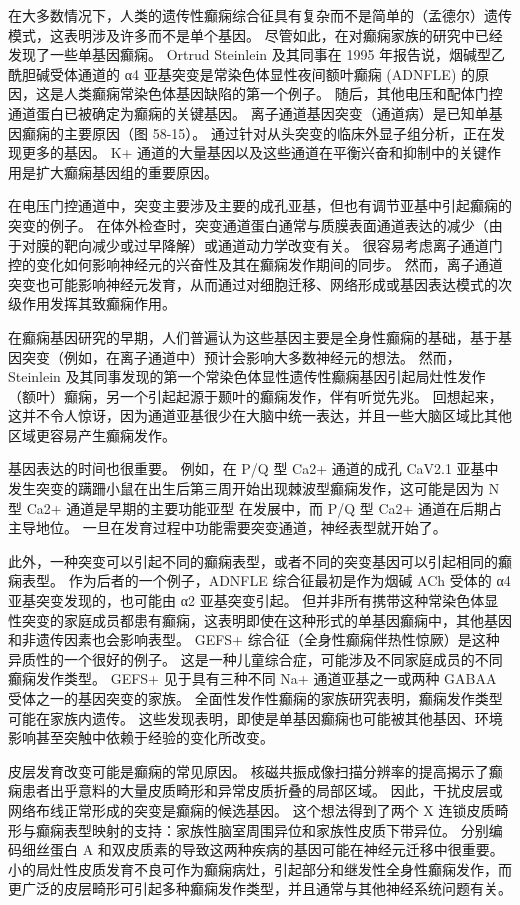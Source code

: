 在大多数情况下，人类的遗传性癫痫综合征具有复杂而不是简单的（孟德尔）遗传模式，这表明涉及许多而不是单个基因。
尽管如此，在对癫痫家族的研究中已经发现了一些单基因癫痫。
Ortrud Steinlein 及其同事在 1995 年报告说，烟碱型乙酰胆碱受体通道的 α4 亚基突变是常染色体显性夜间额叶癫痫 (ADNFLE) 的原因，这是人类癫痫常染色体基因缺陷的第一个例子。
随后，其他电压和配体门控通道蛋白已被确定为癫痫的关键基因。
离子通道基因突变（通道病）是已知单基因癫痫的主要原因（图 58-15）。
通过针对从头突变的临床外显子组分析，正在发现更多的基因。
K+ 通道的大量基因以及这些通道在平衡兴奋和抑制中的关键作用是扩大癫痫基因组的重要原因。


在电压门控通道中，突变主要涉及主要的成孔亚基，但也有调节亚基中引起癫痫的突变的例子。
在体外检查时，突变通道蛋白通常与质膜表面通道表达的减少（由于对膜的靶向减少或过早降解）或通道动力学改变有关。
很容易考虑离子通道门控的变化如何影响神经元的兴奋性及其在癫痫发作期间的同步。
然而，离子通道突变也可能影响神经元发育，从而通过对细胞迁移、网络形成或基因表达模式的次级作用发挥其致癫痫作用。


在癫痫基因研究的早期，人们普遍认为这些基因主要是全身性癫痫的基础，基于基因突变（例如，在离子通道中）预计会影响大多数神经元的想法。
然而，Steinlein 及其同事发现的第一个常染色体显性遗传性癫痫基因引起局灶性发作（额叶）癫痫，另一个引起起源于颞叶的癫痫发作，伴有听觉先兆。
回想起来，这并不令人惊讶，因为通道亚基很少在大脑中统一表达，并且一些大脑区域比其他区域更容易产生癫痫发作。


基因表达的时间也很重要。
例如，在 P/Q 型 Ca2+ 通道的成孔 CaV2.1 亚基中发生突变的蹒跚小鼠在出生后第三周开始出现棘波型癫痫发作，这可能是因为 N 型 Ca2+ 通道是早期的主要功能亚型 在发展中，而 P/Q 型 Ca2+ 通道在后期占主导地位。
一旦在发育过程中功能需要突变通道，神经表型就开始了。


此外，一种突变可以引起不同的癫痫表型，或者不同的突变基因可以引起相同的癫痫表型。
作为后者的一个例子，ADNFLE 综合征最初是作为烟碱 ACh 受体的 α4 亚基突变发现的，也可能由 α2 亚基突变引起。
但并非所有携带这种常染色体显性突变的家庭成员都患有癫痫，这表明即使在这种形式的单基因癫痫中，其他基因和非遗传因素也会影响表型。
GEFS+ 综合征（全身性癫痫伴热性惊厥）是这种异质性的一个很好的例子。 这是一种儿童综合症，可能涉及不同家庭成员的不同癫痫发作类型。
GEFS+ 见于具有三种不同 Na+ 通道亚基之一或两种 GABAA 受体之一的基因突变的家族。
全面性发作性癫痫的家族研究表明，癫痫发作类型可能在家族内遗传。
这些发现表明，即使是单基因癫痫也可能被其他基因、环境影响甚至突触中依赖于经验的变化所改变。


皮层发育改变可能是癫痫的常见原因。
核磁共振成像扫描分辨率的提高揭示了癫痫患者出乎意料的大量皮质畸形和异常皮质折叠的局部区域。
因此，干扰皮层或网络布线正常形成的突变是癫痫的候选基因。
这个想法得到了两个 X 连锁皮质畸形与癫痫表型映射的支持：家族性脑室周围异位和家族性皮质下带异位。
分别编码细丝蛋白 A 和双皮质素的导致这两种疾病的基因可能在神经元迁移中很重要。
小的局灶性皮质发育不良可作为癫痫病灶，引起部分和继发性全身性癫痫发作，而更广泛的皮层畸形可引起多种癫痫发作类型，并且通常与其他神经系统问题有关。


